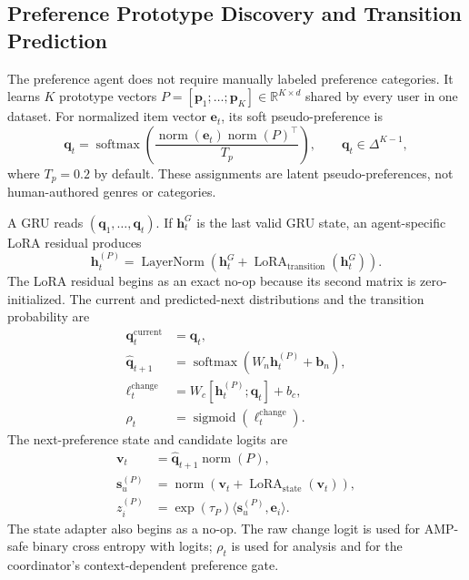 \documentclass[11pt,a4paper]{article}
\newcommand{\R}{\mathbb{R}}
\newcommand{\softmax}{\operatorname{softmax}}
\newcommand{\sigmoid}{\operatorname{sigmoid}}
\begin{document}
\subsection{Preference Prototype Discovery and Transition Prediction}
\label{sec:preference-agent}

The preference agent does not require manually labeled preference categories.
It learns $K$ prototype vectors
$P=[\bm p_1;\ldots;\bm p_K]\in\R^{K\times d}$ shared by every user in one
dataset. For normalized item vector $\bm e_t$, its soft pseudo-preference is
\begin{equation}
  \bm q_t
  =
  \softmax\!\left(
    \frac{\operatorname{norm}(\bm e_t)
    \operatorname{norm}(P)^\top}{T_p}
  \right),
  \qquad \bm q_t\in\Delta^{K-1},
\end{equation}
where $T_p=0.2$ by default. These assignments are latent pseudo-preferences,
not human-authored genres or categories.

A GRU reads $(\bm q_1,\ldots,\bm q_t)$. If $\bm h_t^G$ is the last valid GRU
state, an agent-specific LoRA residual produces
\begin{equation}
  \bm h_t^{(P)}
  =\operatorname{LayerNorm}
    \left(\bm h_t^G+\operatorname{LoRA}_{\mathrm{transition}}(\bm h_t^G)\right).
\end{equation}
The LoRA residual begins as an exact no-op because its second matrix is
zero-initialized. The current and predicted-next distributions and the
transition probability are
\begin{align}
  \bm q_t^{\mathrm{current}} &= \bm q_t,\\
  \widehat{\bm q}_{t+1}
    &=\softmax(W_n\bm h_t^{(P)}+\bm b_n),\\
  \ell_t^{\mathrm{change}}
    &=W_c[\bm h_t^{(P)};\bm q_t]+b_c,\\
  \rho_t&=\sigmoid(\ell_t^{\mathrm{change}}).
\end{align}
The next-preference state and candidate logits are
\begin{align}
  \bm v_t&=\widehat{\bm q}_{t+1}\operatorname{norm}(P),\\
  \bm s_u^{(P)}
    &=\operatorname{norm}\!\left(\bm v_t+
      \operatorname{LoRA}_{\mathrm{state}}(\bm v_t)\right),\\
  z_i^{(P)}&=\exp(\tau_P)\langle\bm s_u^{(P)},\bm e_i\rangle.
\end{align}
The state adapter also begins as a no-op. The raw change logit is used for
AMP-safe binary cross entropy with logits; $\rho_t$ is used for analysis and
for the coordinator's context-dependent preference gate.
\end{document}
